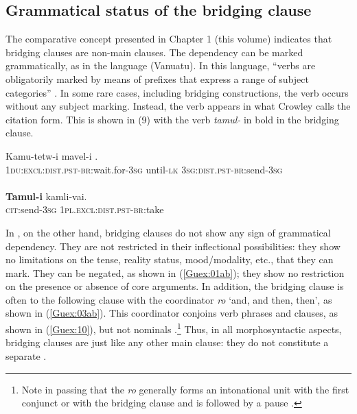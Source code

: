 \documentclass[output=paper]{LSP/langsci}
\begin{document}
\subsection{Grammatical status of the bridging clause} 
\label{Gusec:Status}
The comparative concept presented in Chapter 1 (this volume) indicates that bridging clauses are non-main clauses. The dependency can be marked grammatically, as in the  language  (Vanuatu). In this language, ``verbs are obligatorily marked by means of prefixes that express a range of subject categories'' \citep[][85]{crowley98}. In some rare cases, including bridging constructions, the verb occurs without any subject marking. Instead, the verb appears in what Crowley calls the citation form. This is shown in (9) with the verb \textit{tamul-} in bold in the bridging clause. 

\begin{exe}
	\ex	\label{Guex:9ab}
	\begin{xlist}
\ex	\label{Guex:9a}
		\gll	 Kamu-tetw-i   mavel-i \underline{}.\\
			\textsc{1du:excl:dist.pst-br}:wait.for-\textsc{3sg} 	until-\textsc{lk} \textsc{3sg:dist.pst-br}:send-\textsc{3sg}\\
		\glt	{}\\
\ex	\label{Guex:9b}
		\gll	\textbf{Tamul-i} kamli-vai.\\
			\textsc{cit}:send-\textsc{3sg} \textsc{1pl.excl:dist.pst-br}:take \\
		\glt	{} \citep [][118]{crowley98}
	\end{xlist}
\end{exe}

In , on the other hand, bridging clauses do not show any sign of grammatical dependency. They are not restricted in their inflectional possibilities: they show no limitations on the tense, reality status, mood/modality, etc., that they can mark. They can be negated, as shown in (\ref{Guex:01ab}); they show no restriction on the presence or absence of core arguments. In addition, the bridging clause is often  to the following clause with the coordinator \textit{ro} `and, and then, then', as shown in (\ref{Guex:03ab}). This coordinator conjoins verb phrases and clauses, as shown in (\ref{Guex:10}), but not nominals \citep[][314ff]{guerin11}.\footnote{Note in passing that the  \textit{ro} generally forms an intonational unit with the first conjunct or with the bridging clause and is followed by a pause \citep[][321]{guerin11}.} Thus, in all morphosyntactic aspects, bridging clauses are just like any other main clause: they do not constitute a separate .  
\end{document}
